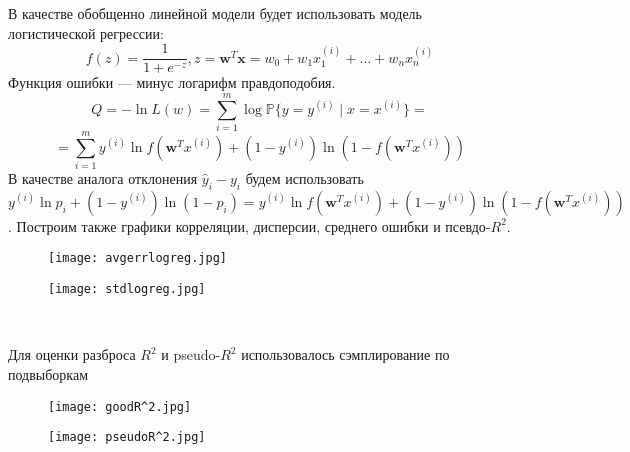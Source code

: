 \documentclass[a4paper,14pt]{extarticle}
\numberwithin{equation}{section}
\begin{document}
В качестве обобщенно линейной модели будет использовать модель логистической регрессии:
\begin{equation}
f(z) = \frac{1}{1+e^{-z}}, z = \mathbf{w}^T\mathbf{x} = w_0 + w_1 x^{(i)}_1 + \dots + w_n x^{(i)}_n
\end{equation}
Функция ошибки --- минус логарифм правдоподобия.
\begin{equation*}
Q = -\ln L(w) = \sum_{i=1}^m \log \mathbb{P}\{y=y^{(i)} \mid x=x^{(i)}\}
= 
\end{equation*}
$$=\sum_{i=1}^m y^{(i)} \ln f(\mathbf{w}^T x^{(i)}) + (1 - y^{(i)}) \ln (1 - f(\mathbf{w}^T x^{(i)}))$$
В качестве аналога отклонения $\hat{y}_i - y_i$ будем использовать $ y^{(i)}\ln p_i + (1-y^{(i)})\ln(1-p_i) = y^{(i)} \ln f(\mathbf{w}^T x^{(i)}) + (1 - y^{(i)}) \ln (1 - f(\mathbf{w}^T x^{(i)}))$. Построим также графики корреляции, дисперсии, среднего ошибки и псевдо-$R^2$.

\begin{figure}[h!]
	
	\begin{minipage}{0.5\linewidth}
		\texttt{[image: avgerrlogreg.jpg]} 
	\end{minipage}
	\hfill
	\begin{minipage}{0.5\linewidth}
		\texttt{[image: stdlogreg.jpg]}
	\end{minipage}\\
\end{figure}
Для оценки разброса $R^2$ и pseudo-$R^2$ использовалось сэмплирование по подвыборкам
\begin{figure}[h!]
	
	\begin{minipage}{0.5\linewidth}
		\texttt{[image: goodR^2.jpg]} 
	\end{minipage}
	\hfill
	\begin{minipage}{0.5\linewidth}
		\texttt{[image: pseudoR^2.jpg]}
	\end{minipage}\\
\end{figure}
	

	
\end{document}

